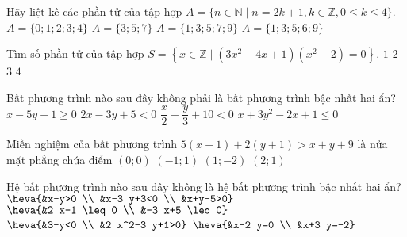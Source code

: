 \begin{ex}%
Hãy liệt kê các phần tử của tập hợp $A=\{n \in \mathbb{N} \mid n=2 k+1, k \in \mathbb{Z}, 0 \leq k \leq 4\}$.
\choice
{$A=\{0 ; 1 ; 2 ; 3 ; 4\}$}
{$A=\{3 ; 5 ; 7\}$}
{\True $A=\{1 ; 3 ; 5 ; 7 ; 9\}$}
{$A=\{1 ; 3 ; 5 ; 6 ; 9\}$}
\end{ex}
\begin{ex}%
Tìm số phần tử của tập hợp $S=\left\{x \in \mathbb{Z} \mid\left(3 x^2-4 x+1\right)\left(x^2-2\right)=0\right\}$.
\choice
{\True $1$}
{$2$}
{$3$}
{$4$}
\end{ex}
\begin{ex}%
Bất phương trình nào sau đây không phải là bất phương trình bậc nhất hai ẩn?
\choice
{$x-5 y-1 \geq 0$}
{$2 x-3 y+5<0$}
{$\dfrac{x}{2}-\dfrac{y}{3}+10<0$}
{\True $x+3 y^2-2 x+1 \leq 0$}
\end{ex}
\begin{ex}%
Miền nghiệm của bất phương trình $5(x+1)+2(y+1)>x+y+9$ là nửa mặt phẳng chứa điểm
\choice
{$(0 ; 0)$}
{$(-1 ; 1)$}
{$(1 ;-2)$}
{\True $(2 ; 1)$}
\end{ex}
\begin{ex}%
Hệ bất phương trình nào sau đây không là hệ bất phương trình bậc nhất hai ẩn?
\choice
{$\heva{&x-y>0 \\
	&x-3 y+3<0 \\
	&x+y-5>0}$}
{$\heva{&2 x-1 \leq 0 \\ &-3 x+5 \leq 0}$}
{\True $\heva{&3-y<0 \\ &2 x^2-3 y+1>0}$}
{$\heva{&x-2 y=0 \\ &x+3 y=-2}$}
\end{ex}
